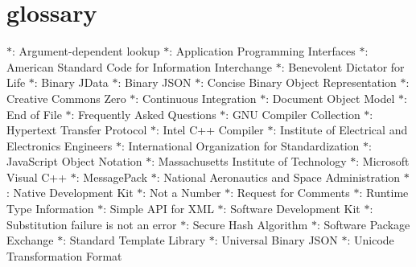 \chapter{glossary }
\hypertarget{md_include_2nlohman_2json-develop_2docs_2mkdocs_2includes_2glossary}{}\label{md_include_2nlohman_2json-develop_2docs_2mkdocs_2includes_2glossary}
\texorpdfstring{$\ast$}{*}\+[ADL]\+:\+ Argument-\/dependent lookup \texorpdfstring{$\ast$}{*}\+[API]\+:\+ Application Programming Interfaces \texorpdfstring{$\ast$}{*}\+[ASCII]\+:\+ American Standard Code for Information Interchange \texorpdfstring{$\ast$}{*}\+[BDFL]\+:\+ Benevolent Dictator for Life \texorpdfstring{$\ast$}{*}\+[BJData]\+:\+ Binary JData \texorpdfstring{$\ast$}{*}\+[BSON]\+:\+ Binary JSON \texorpdfstring{$\ast$}{*}\+[CBOR]\+:\+ Concise Binary Object Representation \texorpdfstring{$\ast$}{*}\+[CC0]\+:\+ Creative Commons Zero \texorpdfstring{$\ast$}{*}\+[CI]\+:\+ Continuous Integration \texorpdfstring{$\ast$}{*}\+[DOM]\+:\+ Document Object Model \texorpdfstring{$\ast$}{*}\+[EOF]\+:\+ End of File \texorpdfstring{$\ast$}{*}\+[FAQ]\+:\+ Frequently Asked Questions \texorpdfstring{$\ast$}{*}\+[GCC]\+:\+ GNU Compiler Collection \texorpdfstring{$\ast$}{*}\+[HTTP]\+:\+ Hypertext Transfer Protocol \texorpdfstring{$\ast$}{*}\+[ICC]\+:\+ Intel C++ Compiler \texorpdfstring{$\ast$}{*}\+[IEEE]\+:\+ Institute of Electrical and Electronics Engineers \texorpdfstring{$\ast$}{*}\+[ISO]\+:\+ International Organization for Standardization \texorpdfstring{$\ast$}{*}\+[JSON]\+:\+ Java\+Script Object Notation \texorpdfstring{$\ast$}{*}\+[MIT]\+:\+ Massachusetts Institute of Technology \texorpdfstring{$\ast$}{*}\+[MSVC]\+:\+ Microsoft Visual C++ \texorpdfstring{$\ast$}{*}\+:\+ Message\+Pack \texorpdfstring{$\ast$}{*}\+[NASA]\+:\+ National Aeronautics and Space Administration \texorpdfstring{$\ast$}{*}\+[NDK]\+:\+ Native Development Kit \texorpdfstring{$\ast$}{*}\+[NaN]\+:\+ Not a Number \texorpdfstring{$\ast$}{*}\+[RFC]\+:\+ Request for Comments \texorpdfstring{$\ast$}{*}\+[RTTI]\+:\+ Runtime Type Information \texorpdfstring{$\ast$}{*}\+[SAX]\+:\+ Simple API for XML \texorpdfstring{$\ast$}{*}\+[SDK]\+:\+ Software Development Kit \texorpdfstring{$\ast$}{*}\+[SFINAE]\+:\+ Substitution failure is not an error \texorpdfstring{$\ast$}{*}\+[SHA]\+:\+ Secure Hash Algorithm \texorpdfstring{$\ast$}{*}\+[SPDX]\+:\+ Software Package  Exchange \texorpdfstring{$\ast$}{*}\+[STL]\+:\+ Standard Template Library \texorpdfstring{$\ast$}{*}\+[UBJSON]\+:\+ Universal Binary JSON \texorpdfstring{$\ast$}{*}\+[UTF]\+:\+ Unicode Transformation Format 
